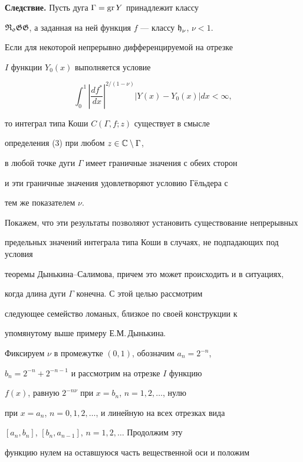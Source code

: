 {\bf Следствие.} Пусть дуга $\Gamma = \operatorname{gr} Y$ принадлежит классу


$\operatorname{\frak {R_{0}GG}}$, а заданная на ней функция $f$ --- классу $\operatorname{\frak h}_{\nu}$, $\nu < 1$.


Если для некоторой непрерывно дифференцируемой на отрезке


$I$ функции $Y_{0}(x)$ выполняется условие


$$


\int_{0}^{1}{\left|\frac{df^*}{dx}\right|^{2/(1-\nu)}


\left|Y(x) - Y_{0}(x)\right|dx} < \infty,


$$


то интеграл типа Коши $C(\Gamma, f;z)$ существует в смысле


определения (3) при любом $z\in {\Bbb C}\setminus\Gamma$,


в любой точке дуги $\Gamma$ имеет граничные значения с обеих сторон


и эти граничные значения удовлетворяют условию Г\"ельдера с


тем же показателем $\nu$.


\medskip





Покажем, что эти результаты позволяют установить существование непрерывных


предельных значений интеграла типа Коши в случаях, не подпадающих под условия


теоремы Дынькина--Салимова, причем это может происходить и в ситуациях,


когда длина дуги $\Gamma$ конечна. С этой целью рассмотрим


следующее семейство ломаных, близкое по своей конструкции к


упомянутому выше примеру Е.М.\,Дынькина.





Фиксируем $\nu$ в промежутке $(0,1)$, обозначим $a_n = 2^{-n}$,


$b_n = 2^{-n}+2^{-n-1}$ и рассмотрим на отрезке $I$ функцию


$f(x)$, равную $2^{-n\nu}$ при $x=b_n$, $n=1,2,\dotsc$, нулю


при $x=a_n$, $n=0,1,2,\dotsc$, и линейную на всех отрезках вида


$[a_n, b_n]$, $[b_n, a_{n-1}]$, $n=1,2,\dotsc$ Продолжим эту


функцию нулем на оставшуюся часть вещественной оси и положим


